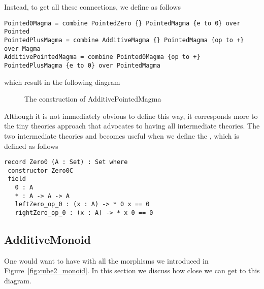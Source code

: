 Instead, to get all these connections, we define  as follows 
\begin{lstlisting}
Pointed0Magma = combine PointedZero {} PointedMagma {e to 0} over Pointed
PointedPlusMagma = combine AdditiveMagma {} PointedMagma {op to +} over Magma
AdditivePointedMagma = combine Pointed0Magma {op to +} PointedPlusMagma {e to 0} over PointedMagma
\end{lstlisting}
which result in the following diagram 
\begin{figure}[h]
    \caption{The construction of AdditivePointedMagma}
    \label{fig:addPointedMagmaReal}
\end{figure}
Although it is not immediately obvious to define  this way, it corresponds more to the tiny theories approach that advocates to having all intermediate theories. The two intermediate theories  and  becomes useful when we define the , which is defined as follows 
\begin{lstlisting}
record Zero0 (A : Set) : Set where
 constructor Zero0C
 field
   0 : A
   * : A -> A -> A
   leftZero_op_0 : (x : A) -> * 0 x == 0
   rightZero_op_0 : (x : A) -> * x 0 == 0
\end{lstlisting}

\subsection{AdditiveMonoid}
One would want to have  with all the morphisms we introduced in Figure~\ref{fig:cube2_monoid}. In this section we discuss how close we can get to this diagram. 

